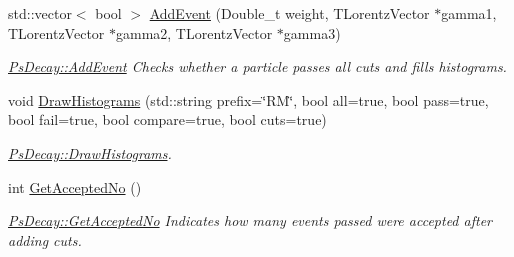 \begin{DoxyCompactItemize}
std\+::vector$<$ bool $>$ \hyperlink{classPsDecay_a85fae0338b221eee90bf497819e71c84}{Add\+Event} (Double\+\_\+t weight, T\+Lorentz\+Vector $\ast$gamma1, T\+Lorentz\+Vector $\ast$gamma2, T\+Lorentz\+Vector $\ast$gamma3)
\begin{DoxyCompactList}\small\item\em \hyperlink{classPsDecay_a85fae0338b221eee90bf497819e71c84}{Ps\+Decay\+::\+Add\+Event} Checks whether a particle passes all cuts and fills histograms. \end{DoxyCompactList}\item 
void \hyperlink{classPsDecay_acf37a3232c075338710e7732da809fbe}{Draw\+Histograms} (std\+::string prefix=\char`\"{}RM\char`\"{}, bool all=true, bool pass=true, bool fail=true, bool compare=true, bool cuts=true)
\begin{DoxyCompactList}\small\item\em \hyperlink{classPsDecay_acf37a3232c075338710e7732da809fbe}{Ps\+Decay\+::\+Draw\+Histograms}. \end{DoxyCompactList}\item 
int \hyperlink{classPsDecay_ae53824e7c6ffc093053bf1aece564044}{Get\+Accepted\+No} ()
\begin{DoxyCompactList}\small\item\em \hyperlink{classPsDecay_ae53824e7c6ffc093053bf1aece564044}{Ps\+Decay\+::\+Get\+Accepted\+No} Indicates how many events passed were accepted after adding cuts. \end{DoxyCompactList}\end{DoxyCompactItemize}
